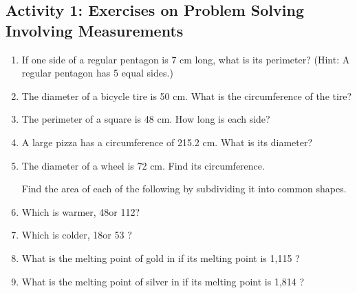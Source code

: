 \subsection*{Activity 1: Exercises on Problem Solving Involving Measurements}
\begin{enumerate}
\item If one side of a regular pentagon is 7 cm long, what is its perimeter? (Hint: A regular pentagon has 5 equal sides.)
\item The diameter of a bicycle tire is 50 cm. What is the circumference of the tire?
\item The perimeter of a square is 48 cm. How long is each side?
\item A large pizza has a circumference of 215.2 cm. What is its diameter?
\item The diameter of a wheel is 72 cm. Find its circumference.

Find the area of each of the following by subdividing it into common shapes.
\item Which is warmer, 48\degree\C or 112\degree\F?
\item Which is colder, 18\degree\C or 53 \degree\F?
\item What is the melting point of gold in \degree\F if its melting point is 1,115 \degree\C?
\item What is the melting point of silver in \degree\C if its melting point is 1,814 \degree\F?
\end{enumerate}

